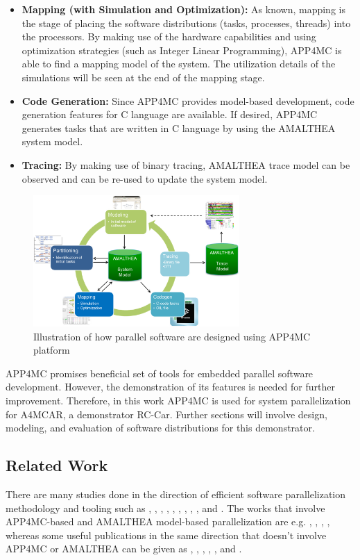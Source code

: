 \begin{itemize}
	\item \textbf{Mapping (with Simulation and Optimization):} As known, mapping is the stage of placing the software distributions (tasks, processes, threads) into the processors. By making use of the hardware capabilities and using optimization strategies (such as Integer Linear Programming), APP4MC is able to find a mapping model of the system. The utilization details of the simulations will be seen at the end of the mapping stage.
	\item \textbf{Code Generation:} Since APP4MC provides model-based development, code generation features for C language are available. If desired, APP4MC generates tasks that are written in C language by using the AMALTHEA system model.
	\item \textbf{Tracing:} By making use of binary tracing, AMALTHEA trace model can be observed and can be re-used to update the system model.
\end{itemize}

\begin{figure}[!ht]
	\centering
	\includegraphics[width=0.7\textwidth]{content/images/app4mcdesign.png}
	\caption{Illustration of how parallel software are designed using APP4MC platform \cite{amalthea4publicweb}}
	\label{fig:app4mcdesign}
\end{figure}

APP4MC promises beneficial set of tools for embedded parallel software development. However, the demonstration of its features is needed for further improvement. Therefore, in this work APP4MC is used for system parallelization for A4MCAR, a demonstrator RC-Car. Further sections will involve design, modeling, and evaluation of software distributions for this demonstrator.

\subsection{Related Work}
There are many studies done in the direction of efficient software parallelization methodology and tooling such as \cite{toolchaintailoringapp4mc}, \cite{priorpaperapp4mc}, \cite{comparisonpaperapp4mc}, \cite{constrainedpaper}, \cite{autosarospaper1}, \cite{paper2}, \cite{paper3}, \cite{paper4}, \cite{paper5}, and \cite{paper6}.
The works that involve APP4MC-based and AMALTHEA model-based parallelization are e.g. \cite{toolchaintailoringapp4mc}, \cite{priorpaperapp4mc}, \cite{comparisonpaperapp4mc}, \cite{constrainedpaper}, whereas some useful publications in the same direction that doesn't involve APP4MC or AMALTHEA can be given as \cite{autosarospaper1}, \cite{paper2}, \cite{paper3}, \cite{paper4}, \cite{paper5}, and \cite{paper6}.

